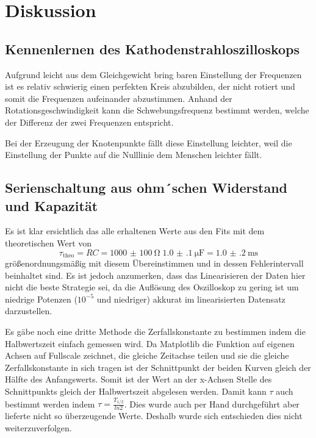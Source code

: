 \documentclass[11pt,ngerman]{scrartcl}
\begin{document}
\section{Diskussion}\label{disk}

\subsection{Kennenlernen des Kathodenstrahloszilloskops}

Aufgrund leicht aus dem Gleichgewicht bring baren Einstellung der Frequenzen
ist es relativ schwierig einen perfekten Kreis abzubilden, der nicht rotiert
und somit die Frequenzen aufeinander abzustimmen. Anhand der
Rotationsgeschwindigkeit kann die Schwebungsfrequenz bestimmt werden, welche
der Differenz der zwei Frequenzen entspricht.

Bei der Erzeugung der Knotenpunkte fällt diese Einstellung leichter, weil die
Einstellung der Punkte auf die Nulllinie dem Menschen leichter fällt.

\subsection{Serienschaltung aus ohm´schen Widerstand und Kapazität}

Es ist klar ersichtlich das alle erhaltenen Werte aus den Fits mit dem theoretischen Wert von
\begin{equation}
	\tau_{\text{theo}} = RC = \SI{1000(100)}{\ohm} \; \SI{1.0(1)}{\micro\farad} = \SI{1.0(2)}{\ms}
	\label{eq:tautheo}
\end{equation}
größenordnungsmäßig mit diesem Übereinstimmen und in dessen Fehlerintervall
beinhaltet sind. Es ist jedoch anzumerken, dass das Linearisieren der Daten
hier nicht die beste Strategie sei, da die Auflösung des Oszilloskop zu gering
ist um niedrige Potenzen ($10^{-5}$ und niedriger) akkurat im linearisierten
Datensatz darzustellen.

Es gäbe noch eine dritte Methode die Zerfallskonstante zu bestimmen indem die
Halbwertszeit einfach gemessen wird. Da Matplotlib die Funktion auf eigenen
Achsen auf Fullscale zeichnet, die gleiche Zeitachse teilen und sie die gleiche
Zerfallskonstante in sich tragen ist der Schnittpunkt der beiden Kurven gleich
der Hälfte des Anfangswerts. Somit ist der Wert an der x-Achsen Stelle des
Schnittpunkts gleich der Halbwertszeit abgelesen werden. Damit kann $\tau$ auch
bestimmt werden indem $\tau = \frac{T_{1/2}}{ln{2}}$. Dies wurde auch per Hand
durchgeführt aber lieferte nicht so überzeugende Werte. Deshalb wurde sich
entschieden dies nicht weiterzuverfolgen.
\end{document}
